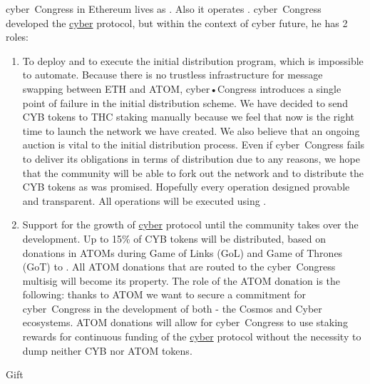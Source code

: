 \documentclass[8pt,oneside]{amsart}
\makeatletter
\newcommand{\linkgreen}[2]{\href{#1}{\color{green}{#2}}}
\renewcommand\subsection{\@startsection{subsection}
                                    {2}{\z@}
                                    {-3.25ex\@plus -1ex \@minus -.2ex}
                                    {0ex \@plus .2ex}
                                    {\play\Large}
                        }
\newcommand{\titleSection}[1]{\subsection{#1}}
\makeatother
\begin{document}
cyber~Congress in Ethereum lives as \linkgreen{https://mainnet.aragon.org/#/cybercongress/0x4feb2bcc5907e7779130c093eef8fb44502c1330/}{Aragon organization}. Also it operates \linkgreen{https://cyberd.ai/account/cyber1809vlaew5u5p24tvmse9kvgytwwr3ej7txe7p6}{2-of-3 multisig in Cyber network}. cyber~Congress developed the {\hyperref[cyber]{cyber}} protocol, but within the context of cyber future, he has 2 roles:
\begin{enumerate}
 \item To deploy and to execute the initial distribution program, which is impossible to automate. Because there is no trustless infrastructure for message swapping between ETH and ATOM, cyber•Congress introduces a single point of failure in the initial distribution scheme. We have decided to send CYB tokens to THC staking manually because we feel that now is the right time to launch the network we have created. We also believe that an ongoing auction is vital to the initial distribution process. Even if cyber~Congress fails to deliver its obligations in terms of distribution due to any reasons, we hope that the community will be able to fork out the network and to distribute the CYB tokens as was promised. Hopefully every operation designed provable and transparent. All operations will be executed using \linkgreen{https://cyberd.ai/account/cyber12v6jzx9vea277aqj0nffll8ewvme35w94yv258}{special purpose 2-of-3 multisig in Cyber network}.
 \item Support for the growth of {\hyperref[cyber]{cyber}} protocol until the community takes over the development. Up to 15\% of CYB tokens will be distributed, based on donations in ATOMs during Game of Links (GoL) and Game of Thrones (GoT) to \linkgreen{https://www.mintscan.io/account/cosmos1809vlaew5u5p24tvmse9kvgytwwr3ej7vd7kgq}{cyber~Congress Cosmos 2-of-3 multisig}. All ATOM donations that are routed to the cyber~Congress multisig will become its property. The role of the ATOM donation is the following: thanks to ATOM we want to secure a commitment for cyber~Congress in the development of both - the Cosmos  and Cyber ecosystems. ATOM donations will allow for cyber~Congress to use staking rewards for continuous funding of the {\hyperref[cyber]{cyber}} protocol without the necessity to dump neither CYB nor ATOM tokens.
\end{enumerate}

\titleSection{Gift}\label{Gift}
\end{document}
